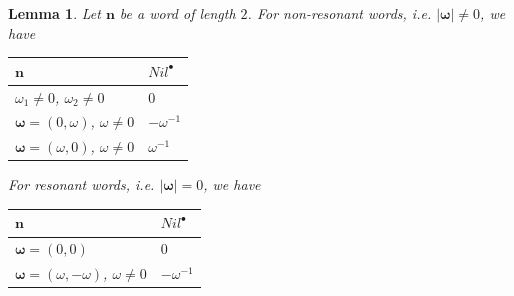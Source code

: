 \documentclass[english,11pt]{amsart}
\newtheorem{lemma}{Lemma}
\def\nn{\mathbf{n}}
\def\nn{\mathbf{n}}
\def\oo{\boldsymbol\omega}
\begin{document}
\begin{lemma}
Let $\nn$ be a word of length $2$. For non-resonant words, i.e. $\mid \oo \mid \not= 0$, we have
\begin{center}
\begin{tabular}{|R{8cm} | L{1.5cm} |}
 \hline   $\nn$ & $Nil^{\bullet}$ \\
 \hline   $\omega_1 \not=0$, $\omega_2 \not= 0$ & $0$ \\
\hline   $\oo =(0,\omega )$, $\omega \not= 0$ & $-\omega^{-1}$\\
\hline    $\oo =(\omega ,0 )$, $\omega \not= 0$ & $\omega^{-1}$\\
\hline
\end{tabular}
\end{center}

For resonant words, i.e. $\mid \oo \mid =0$, we have 

\begin{center}
\begin{tabular}{|R{8cm} | L{1.5cm} |}
 \hline   $\nn$ & $Nil^{\bullet}$ \\
\hline $\oo =(0,0)$ & $0$\\
\hline $\oo =(\omega ,-\omega )$, $\omega \not= 0$ & $-\omega^{-1}$\\
\hline
\end{tabular}
\end{center}
\end{lemma}
\end{document}
